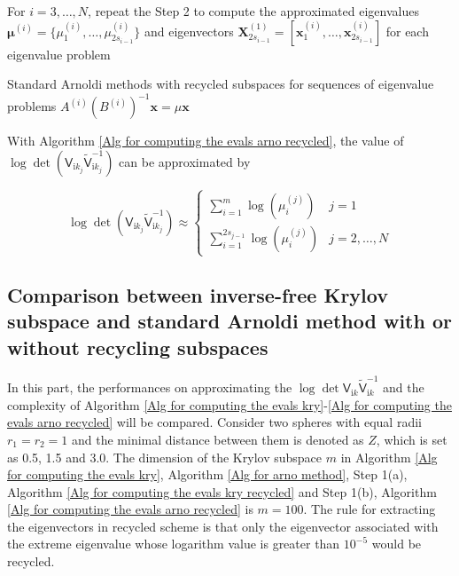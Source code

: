 \begin{algorithm}[H]
\begin{algorithmic}[1]
        \STATE For $i = 3, \dots, N$, repeat the Step 2 to compute the approximated eigenvalues $\boldsymbol{\mu}^{(i)} = \{\mu_{1}^{(i)}, \dots, \mu_{2s_{i-1}}^{(i)}\}$  and eigenvectors $\boldsymbol{X}_{2s_{i-1}}^{(1)} = \left[\boldsymbol{x}_{1}^{(i)}, \dots, \boldsymbol{x}_{2s_{i-1}}^{(i)}\right]$ for each eigenvalue problem
        \end{algorithmic}
    \caption{Standard Arnoldi methods with recycled subspaces for sequences of  eigenvalue problems $A^{(i)}\left(B^{(i)}\right)^{-1} \boldsymbol{x} = \mu \boldsymbol{x}$}
    \label{Alg for computing the evals arno recycled}
    \end{algorithm}    
 
With Algorithm \ref{Alg for computing the evals arno recycled}, the value of 
$\log\det(\mathsf{V}_{\mathrm{i}k_{j}}\tilde{\mathsf{V}}_{\mathrm{i}k_{j}}^{-1})$ can be approximated by 


\begin{equation}
    \log\det(\mathsf{V}_{\mathrm{i}k_{j}}\tilde{\mathsf{V}}_{\mathrm{i}k_{j}}^{-1})  \approx
      \begin{cases}
        \sum_{i = 1}^{m} \log\left(\mu_{i}^{(j)}\right) & j = 1\\
        \sum_{i = 1}^{2s_{j-1}} \log\left(\mu_{i}^{(j)}\right) & j = 2, \dots, N
      \end{cases}       
  \end{equation}

\subsection{Comparison between inverse-free Krylov subspace and standard Arnoldi method with or without recycling subspaces}
In this part, the performances on approximating the $\log\det\mathsf{V}_{\mathrm{i}k}\tilde{\mathsf{V}}_{\mathrm{i}k}^{-1}$ and the complexity 
of Algorithm \ref{Alg for computing the evals kry}-\ref{Alg for computing the evals arno recycled} will be compared.
Consider two spheres with equal radii $r_{1} = r_{2} = 1$ and the minimal distance between them is denoted as $Z$, which is set as 0.5, 1.5 and 3.0. 
The dimension of the Krylov subspace $m$ in Algorithm \ref{Alg for computing the evals kry}, Algorithm \ref{Alg for arno method},  
Step 1(a), Algorithm \ref{Alg for computing the evals kry recycled} and Step 1(b), Algorithm \ref{Alg for computing the evals arno recycled} 
is $m = 100$. The rule for extracting the eigenvectors in recycled scheme is that only the eigenvector associated with the extreme eigenvalue whose 
logarithm value is greater than $10^{-5}$ would be recycled.

